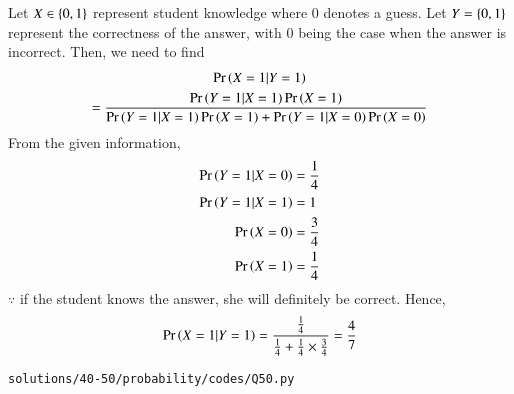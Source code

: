 Let $X \in \left\{0,1\right\}$ represent student knowledge where 0 denotes a guess. Let $Y=\left\{0,1\right\}$ represent the correctness of the answer, with 0 being the case when the answer is incorrect.  Then, we need to find
{\footnotesize
\begin{multline}
\Pr\left(X=1|Y=1\right) 
\\
=\frac{\Pr\left(Y=1|X=1\right)\Pr\left(X=1\right)}{\Pr\left(Y=1|X=1\right)\Pr\left(X=1\right)+\Pr\left(Y=1|X=0\right)\Pr\left(X=0\right)}
\end{multline}
}
From the given information,
\begin{align}
\Pr\left(Y=1|X=0\right) &= \frac{1}{4}
\\
\Pr\left(Y=1|X=1\right) &= 1
\\
\Pr\left(X = 0\right) &=\frac{3}{4}
\\
\Pr\left(X = 1\right) &=\frac{1}{4}
\end{align}
$\because$ if the student knows the answer, she will definitely be correct.
Hence,
\begin{multline}
\Pr\left(X=1|Y=1\right) =\frac{\frac{1}{4}}{\frac{1}{4}+\frac{1}{4}\times\frac{3}{4}}
=\frac{4}{7}
\end{multline}

\begin{lstlisting}
solutions/40-50/probability/codes/Q50.py
\end{lstlisting}
